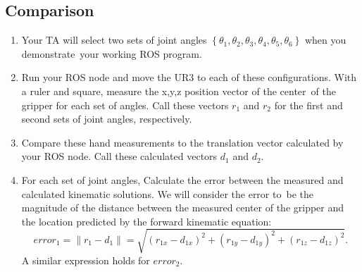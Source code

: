 \subsection{Comparison}
\begin{enumerate}
\item Your TA will select two sets of joint angles $\left\{\theta_1,\theta_2,\theta_3,\theta_4,\theta_5,\theta_6\right\}$ when you demonstrate\
your working ROS program.  
\item Run your ROS node and move the UR3 to each of these configurations.  With a ruler and square, measure the x,y,z position vector of the center\
of the gripper for each set of angles.  Call these vectors $r_1$ and $r_2$ for the first and second sets of joint angles, respectively.

\item Compare these hand measurements to the translation vector calculated by your ROS node.  
Call these calculated vectors $d_1$ and $d_2$.	

\item For each set of joint angles, Calculate the error between the measured and calculated kinematic solutions.  We will consider the error to\
be the magnitude of the distance between the measured center of the gripper and the location predicted by the forward kinematic equation:
\[
error_1 = \left\| r_1 - d_1 \right\| = \sqrt{(r_{1x}-d_{1x})^2 + (r_{1y}-d_{1y})^2 + (r_{1z}-d_{1z})^2}.
\]
A similar expression holds for $error_2$.
\end{enumerate}

